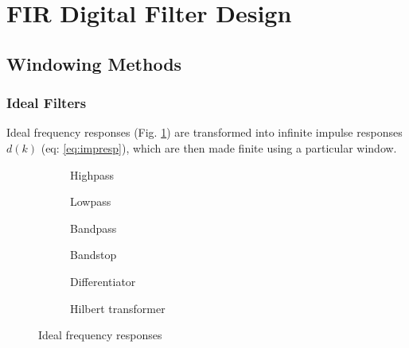 \section{FIR Digital Filter Design}

\subsection{Windowing Methods}
\subsubsection{Ideal Filters}
Ideal frequency responses (Fig. \ref{fig:freqresp}) are transformed into infinite impulse responses $d(k)$ (eq: \ref{eq:impresp}), which are then made finite using a particular window.

\begin{figure}[htp]
\begin{subfigure}{0.49\textwidth}
\centering
\newcommand{\coordinates}{coordinates {
(-3.14,1) (-1.569,1) (-1.571,0)
( 1.571,0) (1.569,1) ( 3.14,1)
};}

\caption{Highpass}
\end{subfigure}
\begin{subfigure}{0.49\textwidth}
\centering
\newcommand{\coordinates}{coordinates {(-3.14,0) (-1.569,0) (-1.571,1) (1.571,1) (1.569,0) (3.14,0)};}

\caption{Lowpass}
\end{subfigure}

\begin{subfigure}{0.49\textwidth}
\centering
\newcommand{\coordinates}{coordinates {
(-3.14,1) (-2.001,1) (-1.999,0) (-1.001,0) (-0.999,1)
(0.999,1) ( 1.001,0) ( 1.999,0) ( 2.001,1) ( 3.14,1)};}

\caption{Bandpass}
\end{subfigure}
\begin{subfigure}{0.49\textwidth}
\centering
\newcommand{\coordinates}{coordinates {
(-3.14,0) (-2.001,0) (-1.999,1) (-1.001,1) (-0.999,0)
(0.999,0) (1.001,1) (1.999,1) (2.001,0) ( 3.14,0)};}

\caption{Bandstop}
\end{subfigure}

\begin{subfigure}{0.49\textwidth}
\centering
\newcommand{\coordinates}{coordinates {(-3.14,-1) (3.14,1)};}

\caption{Differentiator}
\end{subfigure}
\begin{subfigure}{0.49\textwidth}
\centering
\newcommand{\coordinates}{coordinates {(-3.14,1) (-0.001,1) (0.001,-1) (3.14,-1) };}

\caption{Hilbert transformer}
\end{subfigure}

\caption{Ideal frequency responses}
\label{fig:freqresp}
\end{figure}


